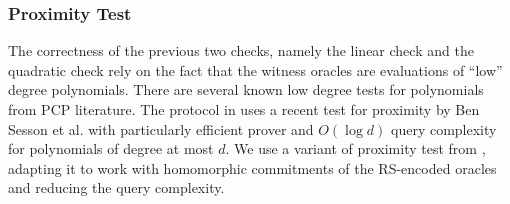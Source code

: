 \begin{comment}
Let $\Sim$ be the simulator. $\Sim$ does the following:
\begin{itemize}
	\item  picks a random subste $Q$ of size $t$.
	\item  uniformly at random chooses $\gamma \in \bbF^m$.
	\item  uniformly at random chooses $r_1 \in \bbF^{ml}$ and $r_2 \in \bbF^m$.
	\item  chooses $t$ columns for $\oracle_{\extwit||x||y||z}$ according to the indices of $Q$.
	\item  computes the commitment of columns indexed by $Q$ for $\oracle_{\extwit||x||y||z}$, and for remaining positions picks uniform values from the range of $\com$, that fixes $\cm_{\extwit||x||y||z}$.
	\item  computes components of $u'$ indexed by $Q$ using $\oracle_{\extwit||x||y||z}$ and $\gamma$. Out of $n$ for remaining $n-t$ picks values for $u'$ in such a way that $u'$ is a valid coedword.
	\item  picks a random polynomial $q^{lin}(\cdot)$ such that degree is $<k+l-1$ and $\sum_{j\in [l]} q^{lin}(\zeta_j) = 0$.
	\item  picks a random polynomial $q^{quad}(\cdot)$ such that degree is $<2k-1$ and $q^{quad}(\zeta_j) = 0$ $\forall j\in [l]$.
\end{itemize} 
Then $\Sim$ outputs a transcript $\tau''$ which is computationally indistinguishable from $\tau'$. Therefore the new protocol has zero knowledge property, and hence \name2D has zero-knowledge property.

\end{comment}

\subsubsection{Proximity Test}
The correctness of the previous two checks, namely the linear check and the
quadratic check rely on the fact that the witness oracles are evaluations of
``low'' degree polynomials. There are several known low degree tests for polynomials
from PCP literature. The protocol in \cite{Aurora} uses a recent test for
proximity by Ben Sesson et al.\cite{IOPP_FRI2018} with particularly efficient
prover and $O(\log d)$ query complexity for polynomials of degree at most $d$. 
We use a variant of proximity test from \cite{Ligero2017}, adapting it to work
with homomorphic commitments of the RS-encoded oracles and reducing the query
complexity.


